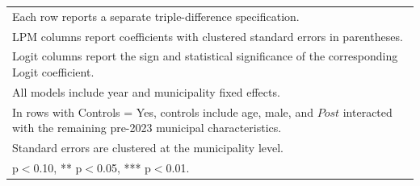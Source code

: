\begin{table}[!htbp]
\begin{tabular}{lcccccr}
\multicolumn{7}{l}{\footnotesize Each row reports a separate triple-difference specification.} \\
\multicolumn{7}{l}{\footnotesize LPM columns report coefficients with clustered standard errors in parentheses.} \\
\multicolumn{7}{l}{\footnotesize Logit columns report the sign and statistical significance of the corresponding Logit coefficient.} \\
\multicolumn{7}{l}{\footnotesize All models include year and municipality fixed effects.} \\
\multicolumn{7}{l}{\footnotesize In rows with Controls = Yes, controls include age, male, and $Post$ interacted with the remaining pre-2023 municipal characteristics.} \\
\multicolumn{7}{l}{\footnotesize Standard errors are clustered at the municipality level.} \\
\multicolumn{7}{l}{\footnotesize * p$<$0.10, ** p$<$0.05, *** p$<$0.01.} \\
\end{tabular}
\end{table}
